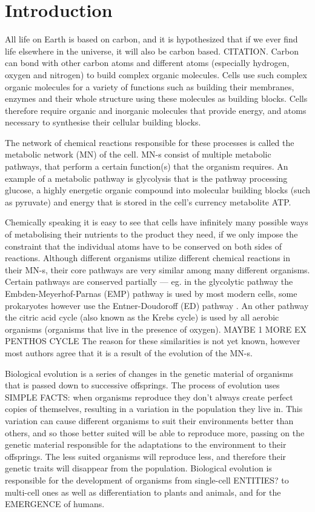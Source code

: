\documentclass[a4paper,12pt]{article}
\begin{document}
	\section{Introduction}

	All life on Earth is based on carbon, and it is hypothesized that if we ever find life elsewhere in the universe, it will also be carbon based. CITATION. Carbon can bond with other carbon atoms and different atoms (especially hydrogen, oxygen and nitrogen) to build complex organic molecules. Cells use such complex organic molecules for a variety of functions such as building their membranes, enzymes and their whole structure using these molecules as building blocks. Cells therefore require organic and inorganic molecules that provide energy, and atoms necessary to synthesise their cellular building blocks.

	The network of chemical reactions responsible for these processes is called the metabolic network (MN) of the cell. MN-s consist of multiple metabolic pathways, that perform a certain function(s) that the organism requires. An example of a metabolic pathway is glycolysis that is the pathway processing glucose, a highly energetic organic compound into molecular building blocks (such as pyruvate) and energy that is stored in the cell's currency metabolite ATP.
	
	Chemically speaking it is easy to see that cells have  infinitely many possible ways of metabolising their nutrients to the product they need, if we only impose the constraint that the individual atoms have to be conserved on both sides of reactions. Although different organisms utilize different chemical reactions in their MN-s, their core pathways are very similar among many different organisms. Certain pathways are conserved partially ---  eg. in the glycolytic pathway the Embden-Meyerhof-Parnas (EMP) pathway \cite{EMPpathway} is used by most modern cells,  some prokaryotes however  use the Entner-Doudoroff (ED) pathway \cite{EDpathway}. An other pathway the citric acid cycle (also known as the Krebs cycle) is used by all aerobic organisms (organisms that live in the presence of oxygen). MAYBE 1 MORE EX PENTHOS CYCLE
	The reason for these similarities is not yet known, however most authors agree that it is a result of the evolution of the MN-s. 

	Biological evolution is a series of changes in the genetic material of organisms that is passed down to successive offsprings. The process of evolution uses SIMPLE FACTS: when organisms reproduce they don't always create perfect copies of themselves, resulting in a variation in the population they live in. This variation can cause different organisms to suit their environments better than others, and so those better suited will be able to reproduce more, passing on the genetic material responsible for the adaptations to the environment to their offsprings. The less suited organisms will reproduce less, and therefore their genetic traits will disappear from the population. 
	 Biological evolution is responsible for the development of organisms from single-cell ENTITIES? to multi-cell ones as well as differentiation to plants and animals, and for the EMERGENCE of humans. 
\end{document}
